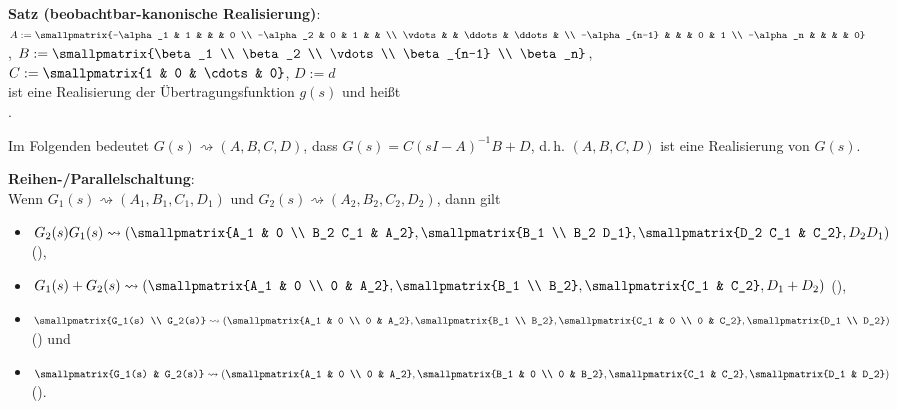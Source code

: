 \textbf{Satz (beobachtbar-kanonische Realisierung)}:\\
$A := \smallpmatrix{-\alpha_1 & 1 & & & 0 \\ -\alpha_2 & 0 & 1 & & \\
\vdots & & \ddots & \ddots & \\ -\alpha_{n-1} & & & 0 & 1 \\ -\alpha_n & & & & 0}$,
$B := \smallpmatrix{\beta_1 \\ \beta_2 \\ \vdots \\ \beta_{n-1} \\ \beta_n}$,
$C := \smallpmatrix{1 & 0 & \cdots & 0}$,
$D := d$\\
ist eine Realisierung der Übertragungsfunktion $g(s)$ und heißt\\
.

\linie

Im Folgenden bedeutet $G(s) \rightsquigarrow (A, B, C, D)$, dass
$G(s) = C(sI - A)^{-1} B + D$, d.\,h.
$(A, B, C, D)$ ist eine Realisierung von $G(s)$.

\textbf{Reihen-/Parallelschaltung}:\\
Wenn $G_1(s) \rightsquigarrow (A_1, B_1, C_1, D_1)$ und
$G_2(s) \rightsquigarrow (A_2, B_2, C_2, D_2)$,
dann gilt
\begin{itemize}
    \item
    $G_2(s) G_1(s) \rightsquigarrow
    \left(\smallpmatrix{A_1 & 0 \\ B_2 C_1 & A_2}, \smallpmatrix{B_1 \\ B_2 D_1},
    \smallpmatrix{D_2 C_1 & C_2}, D_2 D_1\right)$
    (),
    
    \item
    $G_1(s) + G_2(s) \rightsquigarrow
    \left(\smallpmatrix{A_1 & 0 \\ 0 & A_2}, \smallpmatrix{B_1 \\ B_2},
    \smallpmatrix{C_1 & C_2}, D_1 + D_2\right)$
    (),
    
    \item
    $\smallpmatrix{G_1(s) \\ G_2(s)} \rightsquigarrow
    \left(\smallpmatrix{A_1 & 0 \\ 0 & A_2}, \smallpmatrix{B_1 \\ B_2},
    \smallpmatrix{C_1 & 0 \\ 0 & C_2}, \smallpmatrix{D_1 \\ D_2}\right)$
    () und
    
    \item
    $\smallpmatrix{G_1(s) & G_2(s)} \rightsquigarrow
    \left(\smallpmatrix{A_1 & 0 \\ 0 & A_2}, \smallpmatrix{B_1 & 0 \\ 0 & B_2},
    \smallpmatrix{C_1 & C_2}, \smallpmatrix{D_1 & D_2}\right)$
    ().
\end{itemize}

